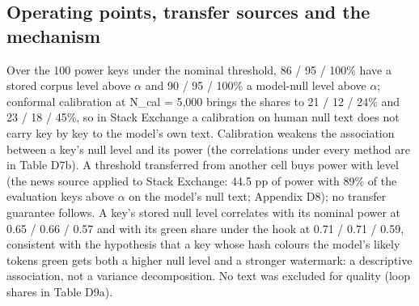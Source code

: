 \documentclass[11pt,letterpaper]{article}
\begin{document}
\hypertarget{operating-points-transfer-sources-and-the-mechanism}{%
\subsection{Operating points, transfer sources and the mechanism}\label{operating-points-transfer-sources-and-the-mechanism}}

Over the 100 power keys under the nominal threshold, 86 / 95 / 100\% have a stored corpus level above \ensuremath{\alpha} and 90 / 95 / 100\% a model-null level above \ensuremath{\alpha}; conformal calibration at N\_cal = 5,000 brings the shares to 21 / 12 / 24\% and 23 / 18 / 45\%, so in Stack Exchange a calibration on human null text does not carry key by key to the model's own text. Calibration weakens the association between a key's null level and its power (the correlations under every method are in Table D7b). A threshold transferred from another cell buys power with level (the news source applied to Stack Exchange: 44.5 pp of power with 89\% of the evaluation keys above \ensuremath{\alpha} on the model's null text; Appendix D8); no transfer guarantee follows. A key's stored null level correlates with its nominal power at 0.65 / 0.66 / 0.57 and with its green share under the hook at 0.71 / 0.71 / 0.59, consistent with the hypothesis that a key whose hash colours the model's likely tokens green gets both a higher null level and a stronger watermark: a descriptive association, not a variance decomposition. No text was excluded for quality (loop shares in Table D9a).
\end{document}
